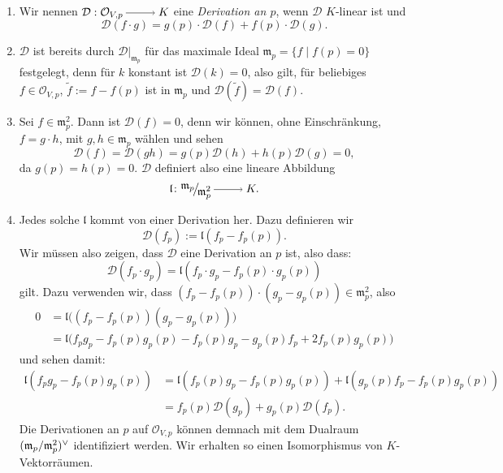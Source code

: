 \documentclass[a4paper,12pt]{scrbook}
\theoremstyle{keinenummern} %
\theoremstyle{mitnummern}
\theoremstyle{unserbeweis}
\def\O{\mathcal{O}}
\newcommand{\DD}{\mathcal{D}} %
\def\l{\mathfrak{l}}
\def\m{\mathfrak{m}}
\newcommand{\restrict}[1]{|_{#1}}
\newcommand{\ra}{\raisebox{-1pt}{\tikz{\draw[thin,shorten >=3pt, ->] (0,0) node{\hspace*{-2pt}} -- node{} (1,0);}}\penalty1000\relax}
\newcommand{\Quotient}[2]{
  \mathchoice
  { %
    \raisebox{0.7ex}{\ensuremath{#1}}
    \ensuremath{\mkern-3mu}\big/\ensuremath{\mkern-3mu}
    \raisebox{-0.6ex}{\ensuremath{#2}}
  }
  { %
    #1/#2
  }
  { %
    #1/#2
  }
  { %
    #1/#2
  }
}
\begin{document}
\begin{db}\label{3.3.7}
\begin{enumerate}
\item{} Wir nennen $\DD:\O_{V,p}\ra K$ eine \emph{Derivation an $p$}, wenn $\DD$ $K$-linear ist und 
\[\DD(f\cdot g)=g(p)\cdot\DD(f)+f(p)\cdot\DD(g).\]
\item{} $\DD$ ist bereits durch $\DD\restrict{\m_{p}}$ für das maximale Ideal $\m_{p}=\{f\mid f(p)=0\}$ festgelegt, denn für $k$ konstant ist $\DD(k)=0$, also gilt, für beliebiges $f\in\O_{V,p}$, $\tilde{f}:=f-f(p)$ ist in $\m_{p}$ und $\DD(\tilde{f})=\DD(f)$.
\item{} Sei $f\in\m_{p}^{2}$. Dann ist $\DD(f)=0$, denn wir können, ohne Einschränkung, $f=g\cdot h$, mit $g,h\in\m_{p}$ wählen und sehen
\[\DD(f)=\DD(gh)=g(p)\DD(h)+h(p)\DD(g)=0,\]
da $g(p)=h(p)=0$. $\DD$ definiert also eine lineare Abbildung
\[\l\colon\Quotient{\m_{p}}{\m_{p}^{2}}\ra K.\]
\item{} Jedes solche $\l$ kommt von einer Derivation her. Dazu definieren wir \[\DD(f_{p}):=\l(f_{p}-f_{p}(p)).\]
%
Wir müssen also zeigen, dass $\DD$ eine Derivation an $p$ ist, also dass:
\[\DD(f_{p}\cdot g_{p})=\l(f_{p}\cdot g_{p}-f_{p}(p)\cdot g_{p}(p))\]
gilt. Dazu verwenden wir, dass $(f_{p}-f_{p}(p))\cdot(g_{p}-g_{p}(p))\in\m_{p}^{2}$, also
\begin{align*}
0&=\l\bigl((f_{p}-f_{p}(p))(g_{p}-g_{p}(p))\bigr)\\
&=\l\bigr(f_{p}g_{p}-f_{p}(p)g_{p}(p)-f_{p}(p)g_{p}-g_{p}(p)f_{p}+2f_{p}(p)g_{p}(p)\bigl)
\end{align*}
 und sehen damit:
\begin{align*}
\l(f_{p}g_{p}-f_{p}(p)g_{p}(p))&=\l(f_{p}(p)g_{p}-f_{p}(p)g_{p}(p)) + \l(g_{p}(p)f_{p}-f_{p}(p)g_{p}(p))\\
&=f_{p}(p)\DD(g_{p})+g_{p}(p)\DD(f_{p}).
\end{align*}
Die Derivationen an $p$ auf $\O_{V,p}$ können demnach mit dem Dualraum $(\Quotient{\m_{p}}{\m_{p}^{2}})^{\vee}$ identifiziert werden. Wir erhalten so einen Isomorphismus von $K$-Vektorräumen.
\end{enumerate}\end{db}
\end{document}
